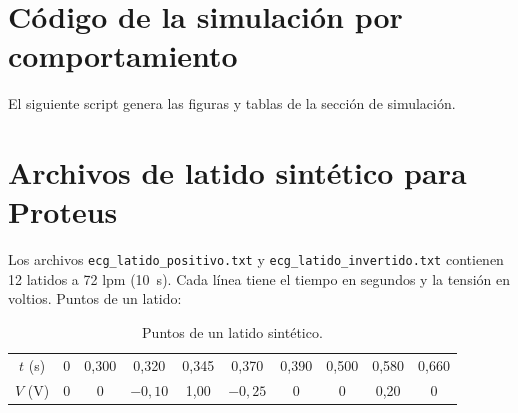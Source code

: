 \documentclass[11pt,letterpaper]{article}
\begin{document}
\appendix
\newpage
\section{Código de la simulación por comportamiento}\label{anx:codigo}
El siguiente script genera las figuras y tablas de la sección de simulación.


\section{Archivos de latido sintético para Proteus}
Los archivos \texttt{ecg\_latido\_positivo.txt} y \texttt{ecg\_latido\_invertido.txt} contienen 12 latidos a 72 lpm (\SI{10}{s}). Cada línea tiene el tiempo en segundos y la tensión en voltios. Puntos de un latido:

\begin{table}[H]
\centering
\caption{Puntos de un latido sintético.}\label{tab:pwlin}
\begin{tabular}{@{}cccccccccc@{}}
\toprule
$t$ (s) & 0 & 0,300 & 0,320 & 0,345 & 0,370 & 0,390 & 0,500 & 0,580 & 0,660 \\
$V$ (V) & 0 & 0 & $-0{,}10$ & 1,00 & $-0{,}25$ & 0 & 0 & 0,20 & 0 \\
\bottomrule
\end{tabular}
\end{table}
\end{document}
